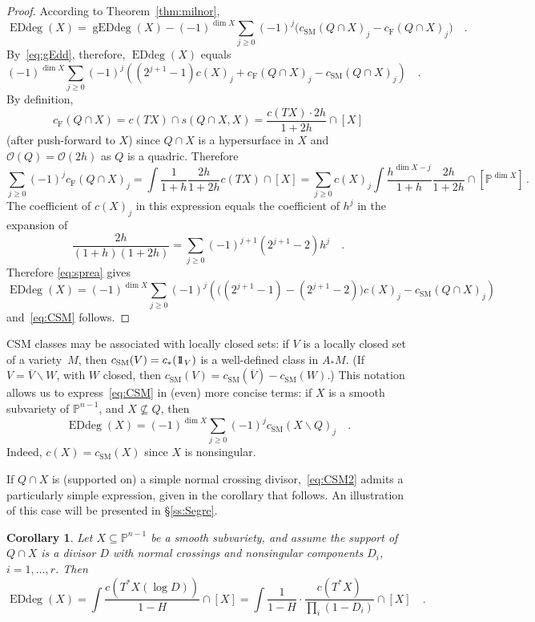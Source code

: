 \documentclass[11pt]{amsart}
\newtheorem{corol}[theorem]{Corollary}
\numberwithin{equation}{section}
\newcommand{\Pbb}{{\mathbb{P}}}
\newcommand{\cO}{{\mathscr O}}
\newcommand{\one}{1\hskip-3.5pt1}
\newcommand{\csm}{{c_{\text{SM}}}}
\newcommand{\cf}{{c_{\text{F}}}}
\DeclareMathOperator{\Edd}{EDdeg}
\DeclareMathOperator{\gEdd}{gEDdeg}
\begin{document}
\begin{proof}
According to Theorem~\ref{thm:milnor},
\[
\Edd(X) =\gEdd(X)-(-1)^{\dim X} \sum_{j\ge 0}(-1)^j\big(\csm(Q\cap X)_j-\cf(Q\cap X)_j\big)\quad.
\]
By~\eqref{eq:gEdd}, therefore, $\Edd(X)$ equals
\begin{equation}\label{eq:sprea}
(-1)^{\dim X} \sum_{j\ge 0} (-1)^j
\left((2^{j+1}-1) c(X)_j + \cf(Q\cap X)_j - \csm(Q\cap X)_j \right)\quad.
\end{equation}
By definition,
\[
\cf(Q\cap X) = c(TX)\cap s(Q\cap X,X) = \frac{c(TX)\cdot 2h}{1+2h}\cap [X]
\]
(after push-forward to $X$) since $Q\cap X$ is a hypersurface in $X$ and $\cO(Q)=\cO(2h)$
as $Q$ is a quadric. Therefore
\[
\sum_{j\ge 0} (-1)^j \cf(Q\cap X)_j = \int \frac 1{1+h} \frac{2h}{1+2h}c(TX)\cap [X]
=\sum_{j\ge 0} c(X)_j \int \frac {h^{\dim X-j}}{1+h} \frac{2h}{1+2h} \cap [\Pbb^{\dim X}]
\,.
\]
The coefficient of $c(X)_j$ in this expression equals the coefficient of $h^j$ in the
expansion of
\[
\frac {2h}{(1+h)(1+2h)} = \sum_{j\ge 0} (-1)^{j+1} (2^{j+1}-2) h^j\quad.
\]
Therefore \eqref{eq:sprea} gives
\[
\Edd(X) = (-1)^{\dim X} \sum_{j\ge 0} (-1)^j
\left(\big((2^{j+1}-1)-(2^{j+1}-2)\big) c(X)_j - \csm(Q\cap X)_j \right)
\]
and~\eqref{eq:CSM} follows.
\end{proof}

CSM classes may be associated with locally closed sets: if $V$ is a locally closed
set of a variety~$M$, then $\csm(V)=c_*(\one_V)$ is a well-defined class in $A_*M$.
(If $V=\overline V\smallsetminus W$, with $W$ closed, then $\csm(V)=\csm(\overline V)
-\csm(W)$.) This notation allows us to express~\eqref{eq:CSM} in (even) more concise 
terms: if $X$ is a smooth subvariety of $\Pbb^{n-1}$, and $X\not\subseteq Q$, then 
\begin{equation}\label{eq:CSM2}
\Edd(X) = (-1)^{\dim X} \sum_{j\ge 0} (-1)^j \csm(X\smallsetminus Q)_j\quad.
\end{equation}
Indeed, $c(X)=\csm(X)$ since $X$ is nonsingular.

If $Q\cap X$ is (supported on) a simple normal crossing 
divisor,~\eqref{eq:CSM2} admits a particularly simple expression, given in
the corollary that follows. An illustration of this case will be presented in 
\S\ref{ss:Segre}.

\begin{corol}\label{cor:SNC}
Let $X\subseteq \Pbb^{n-1}$ be a smooth subvariety, and assume the support of
$Q\cap X$ is a divisor $D$ with normal crossings and nonsingular components $D_i$,
$i=1,\dots, r$. Then
\[
\Edd(X) = \int \frac{c(T^*X(\log D))}{1-H}\cap [X] = 
\int \frac 1{1-H}\cdot \frac{c(T^*X)}{\prod_i (1-D_i)}\cap [X]\quad.
\]
\end{corol}
\end{document}
